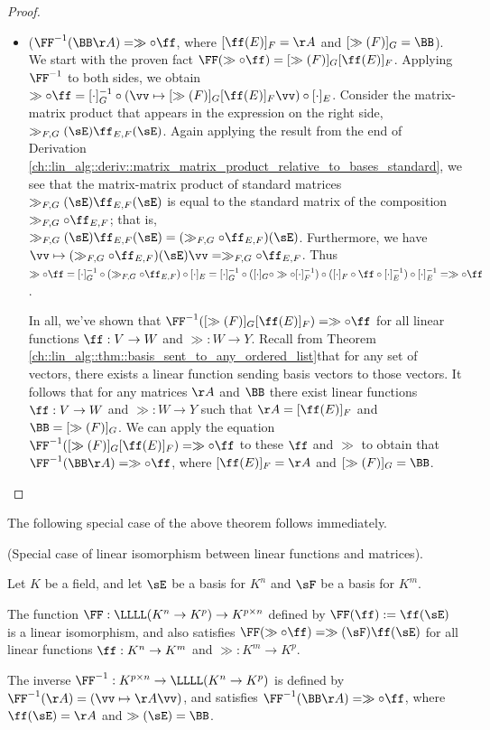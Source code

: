 \begin{proof}
\begin{itemize}
        \item ($\FF^{-1}(\BB \AA) = \gg \circ \ff$, where $[\ff(E)]_F = \AA$ and $[\gg(F)]_G = \BB$). We start with the proven fact ${\FF(\gg \circ \ff) = [\gg(F)]_G [\ff(E)]_F}$. Applying $\FF^{-1}$ to both sides, we obtain ${\gg \circ \ff = [\cdot]_G^{-1} \circ (\vv \mapsto [\gg(F)]_G [\ff(E)]_F \vv) \circ [\cdot]_E}$. Consider the matrix-matrix product that appears in the expression on the right side, $\gg_{F,G}(\sE) \ff_{E,F}(\sE)$. Again applying the result from the end of Derivation \ref{ch::lin_alg::deriv::matrix_matrix_product_relative_to_bases_standard}, we see that the matrix-matrix product of standard matrices $\gg_{F,G}(\sE) \ff_{E,F}(\sE)$ is equal to the standard matrix of the composition $\gg_{F,G} \circ \ff_{E,F}$; that is, \\ ${\gg_{F,G}(\sE) \ff_{E,F}(\sE) = (\gg_{F,G} \circ \ff_{E,F})(\sE)}$. Furthermore, we have
        ${\vv \mapsto (\gg_{F,G} \circ \ff_{E,F})(\sE) \vv = \gg_{F,G} \circ \ff_{E,F}}$. Thus $\gg \circ \ff = [\cdot]_G^{-1} \circ (\gg_{F,G} \circ \ff_{E,F}) \circ [\cdot]_E = [\cdot]_G^{-1} \circ ([\cdot]_G \circ \gg \circ [\cdot]_F^{-1}) \circ ([\cdot]_F \circ \ff \circ [\cdot]_E^{-1}) \circ [\cdot]_E^{-1} = \gg \circ \ff$.
        
        In all, we've shown that $\FF^{-1}([\gg(F)]_G [\ff(E)]_F) = \gg \circ \ff$ for all linear functions $\ff:V \rightarrow W$ and $\gg:W \rightarrow Y$. Recall from Theorem \ref{ch::lin_alg::thm::basis_sent_to_any_ordered_list}that for any set of vectors, there exists a linear function sending basis vectors to those vectors. It follows that for any matrices $\AA$ and $\BB$ there exist linear functions $\ff:V \rightarrow W$ and $\gg:W \rightarrow Y$ such that $\AA = [\ff(E)]_F$ and $\BB = [\gg(F)]_G$. We can apply the equation $\FF^{-1}([\gg(F)]_G [\ff(E)]_F) = \gg \circ \ff$ to these $\ff$ and $\gg$ to obtain that $\FF^{-1}(\BB \AA) = \gg \circ \ff$, where $[\ff(E)]_F = \AA$ and $[\gg(F)]_G = \BB$.
    \end{itemize}
\end{proof}

The following special case of the above theorem follows immediately.

\begin{theorem}
    \label{ch::lin_alg::thm::linear_functions_matrices_isomorphism_special_case}

    (Special case of linear isomorphism between linear functions and matrices).
    
    Let $K$ be a field, and let $\sE$ be a basis for $K^n$ and $\sF$ be a basis for $K^m$.
    
    The function $\FF:\LLLL(K^n \rightarrow K^p) \rightarrow K^{p \times n}$ defined by $\FF(\ff) := \ff(\sE)$ is a linear isomorphism, and also satisfies $\FF(\gg \circ \ff) = \gg(\sF) \ff(\sE)$ for all linear functions $\ff:K^n \rightarrow K^m$ and $\gg:K^m \rightarrow K^p$.

    The inverse $\FF^{-1}:K^{p \times n} \rightarrow \LLLL(K^n \rightarrow K^p)$ is defined by $\FF^{-1}(\AA) = (\vv \mapsto \AA \vv)$, and satisfies $\FF^{-1}(\BB \AA) = \gg \circ \ff$, where $\ff(\sE) = \AA$ and $\gg(\sE) = \BB$.
\end{theorem}

